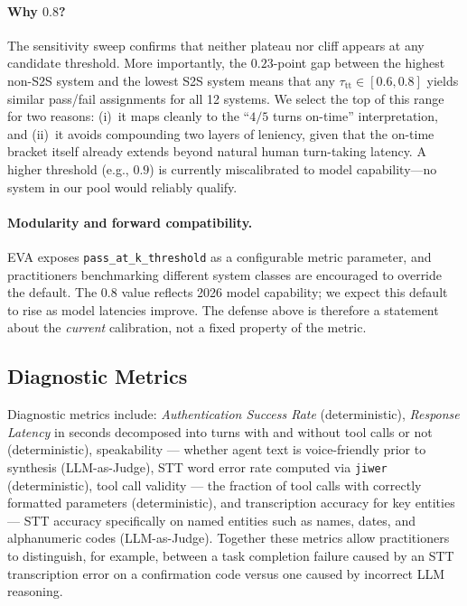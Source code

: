 \paragraph{Why $\boldsymbol{0.8}$?}
The sensitivity sweep confirms that neither plateau nor cliff appears at any
candidate threshold. More importantly, the $0.23$-point gap between the highest
non-S2S system and the lowest S2S system means that any
$\tau_{\text{tt}} \in [0.6, 0.8]$ yields similar pass/fail assignments for
all 12 systems. We select the top of this range for two reasons:
(i)~it maps cleanly to the ``$4/5$ turns on-time'' interpretation, and
(ii)~it avoids compounding two layers of leniency, given that the on-time
bracket itself already extends beyond natural human turn-taking latency.
A higher threshold (e.g., $0.9$) is currently miscalibrated to model
capability---no system in our pool would reliably qualify.

\paragraph{Modularity and forward compatibility.}
EVA exposes \texttt{pass\_at\_k\_threshold} as a configurable metric parameter, and
practitioners benchmarking different system classes are encouraged to override the
default. The $0.8$ value reflects 2026 model capability; we expect this default to rise
as model latencies improve. The defense above is therefore a statement about the
\emph{current} calibration, not a fixed property of the metric.

\subsection{Diagnostic Metrics}
\label{app:diagnostic-metrics}
Diagnostic metrics include: \textit{Authentication Success Rate} (deterministic), \textit{Response Latency} in seconds decomposed into turns with and without tool calls or not (deterministic), speakability — whether agent text is voice-friendly prior to synthesis (LLM-as-Judge), STT word error rate computed via \texttt{jiwer} (deterministic), tool call validity — the fraction of tool calls with correctly formatted parameters (deterministic), and transcription accuracy for key entities — STT accuracy specifically on named entities such as names, dates, and alphanumeric codes (LLM-as-Judge). Together these metrics allow practitioners to distinguish, for example, between a task completion failure caused by an STT transcription error on a confirmation code versus one caused by incorrect LLM reasoning.
